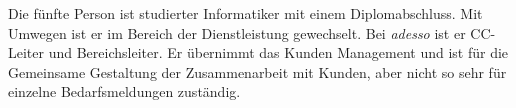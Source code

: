 Die fünfte Person ist studierter Informatiker mit einem Diplomabschluss. Mit Umwegen ist er im Bereich der Dienstleistung gewechselt. Bei \emph{adesso} ist er CC-Leiter und Bereichsleiter. Er übernimmt das Kunden Management und ist für die Gemeinsame Gestaltung der Zusammenarbeit mit Kunden, aber nicht so sehr für einzelne Bedarfsmeldungen zuständig.\\








